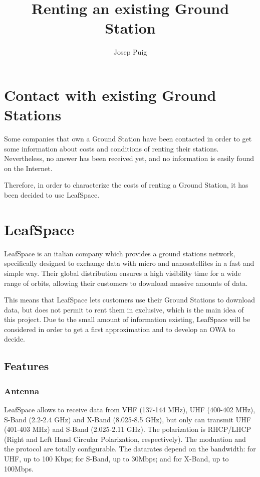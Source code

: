 \documentclass[12pt,a4paper]{report}
\author{Josep Puig}
\title{Renting an existing Ground Station}
\begin{document}
\maketitle


\chapter{Contact with existing Ground Stations}

Some companies that own a Ground Station have been contacted in order to get some information about costs and conditions of renting their stations. Nevertheless, no answer has been received yet, and no information is easily found on the Internet. 

Therefore, in order to characterize the costs of renting a Ground Station, it has been decided to use LeafSpace. 

\chapter{LeafSpace}
LeafSpace is an italian company which provides a ground stations network, specifically designed to exchange data with micro and nanosatellites in a fast and simple way. Their global distribution ensures a high visibility time for a wide range of orbits, allowing their customers to download massive amounts of data. 

This means that LeafSpace lets customers use their Ground Stations to download data, but does not permit to rent them in exclusive, which is the main idea of this project. Due to the small amount of information existing, LeafSpace will be considered in order to get a first approximation and to develop an OWA to decide. 

\section{Features}
\subsection{Antenna}
LeafSpace allows to receive data from VHF (137-144 MHz), UHF (400-402 MHz), S-Band (2.2-2.4 GHz) and X-Band (8.025-8.5 GHz), but only can transmit UHF (401-403 MHz) and S-Band (2.025-2.11 GHz). The polarization is RHCP/LHCP (Right and Left Hand Circular Polarization, respectively). The moduation and the protocol are totally configurable. The datarates depend on the bandwidth: for UHF, up to 100 Kbps; for S-Band, up to 30Mbps; and for X-Band, up to 100Mbps. 
\end{document}
